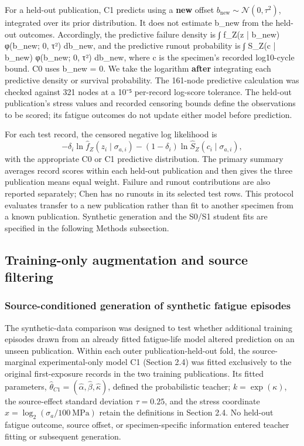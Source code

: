 \documentclass[12pt,a4paper]{article}
\begin{document}
For a held-out publication, C1 predicts using a \textbf{new} offset \(b_{\mathrm{new}}\sim\mathcal N(0,\tau^2)\), integrated over its prior distribution. It does not estimate b\_new from the held-out outcomes. Accordingly, the predictive failure density is ∫ f\_Z(z | b\_new) φ(b\_new; 0, τ²) db\_new, and the predictive runout probability is ∫ S\_Z(c | b\_new) φ(b\_new; 0, τ²) db\_new, where c is the specimen's recorded log10-cycle bound. C0 uses b\_new = 0. We take the logarithm \textbf{after} integrating each predictive density or survival probability. The 161-node predictive calculation was checked against 321 nodes at a 10⁻⁵ per-record log-score tolerance. The held-out publication's stress values and recorded censoring bounds define the observations to be scored; its fatigue outcomes do not update either model before prediction.

For each test record, the censored negative log likelihood is
\[
-\delta_i\ln\widehat{f}_Z(z_i\mid\sigma_{a,i})
-(1-\delta_i)\ln\widehat{S}_Z(c_i\mid\sigma_{a,i}),
\]
with the appropriate C0 or C1 predictive distribution. The primary summary averages record scores within each held-out publication and then gives the three publication means equal weight. Failure and runout contributions are also reported separately; Chen has no runouts in its selected test rows. This protocol evaluates transfer to a new publication rather than fit to another specimen from a known publication. Synthetic generation and the S0/S1 student fits are specified in the following Methods subsection.


\subsection{Training-only augmentation and source filtering}

\subsubsection{Source-conditioned generation of synthetic fatigue episodes}

The synthetic-data comparison was designed to test whether additional training episodes drawn from an already fitted fatigue-life model altered prediction on an unseen publication. Within each outer publication-held-out fold, the source-marginal experimental-only model C1 (Section 2.4) was fitted exclusively to the original first-exposure records in the two training publications. Its fitted parameters, \(\widehat{\theta}_{C1}=(\widehat{\alpha},\widehat{\beta},\widehat{\kappa})\), defined the probabilistic teacher; \(k=\exp(\kappa)\), the source-effect standard deviation \(\tau=0.25\), and the stress coordinate \(x=\log_2(\sigma_a/100\ \mathrm{MPa})\) retain the definitions in Section 2.4. No held-out fatigue outcome, source offset, or specimen-specific information entered teacher fitting or subsequent generation.
\end{document}
